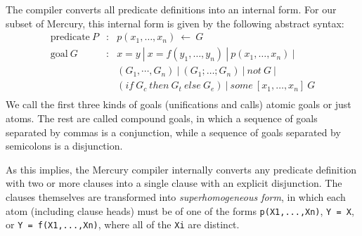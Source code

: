 \documentclass{tlp}
\newcommand{\code}[1]{{\tt#1}}
\begin{document}
The compiler converts all predicate definitions into an internal form.
For our subset of Mercury,
this internal form is given by the following abstract syntax:
$$
\begin{array}{lcl}
\mbox{predicate}~P & : & p(x_1, \ldots, x_n)~\leftarrow~G\\
\mbox{goal}~G      & : & x = y ~|~ x = f(y_1, \ldots, y_n) ~|~
                            p(x_1, \ldots, x_n) ~|~ \\
                   &   & (G_1, \cdots, G_n) ~|~ (G_1 ; \ldots ; G_n) ~|~
                            not~G ~|~ \\
                   &   & (if~G_c~then~G_t~else~G_e) ~|~
                            some~[x_1,\ldots,x_n]~G \\
\end{array}
$$
We call the first three kinds of goals (unifications and calls)
atomic goals or just atoms.
The rest are called compound goals, in which
a sequence of goals separated by commas is a conjunction, while
a sequence of goals separated by semicolons is a disjunction.

As this implies, the Mercury compiler internally converts
any predicate definition with two or more clauses
into a single clause with an explicit disjunction.
The clauses themselves are transformed into \emph{superhomogeneous form},
in which each atom (including clause heads) must be of one of the forms
\code{p(X1,...,Xn)}, \code{Y = X}, or \code{Y = f(X1,...,Xn)},
where all of the \code{Xi} are distinct.
\end{document}
